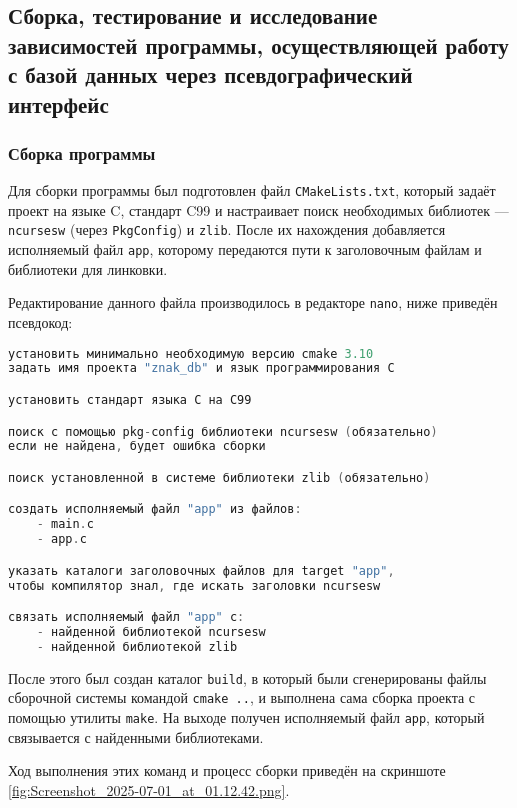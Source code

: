 \subsection{Сборка, тестирование и исследование зависимостей программы, осуществляющей работу с базой данных через псевдографический интерфейс}

\subsubsection{Сборка программы}

Для сборки программы был подготовлен файл \texttt{CMakeLists.txt}, который задаёт проект на языке C, стандарт C99 и настраивает поиск необходимых библиотек --- \texttt{ncursesw} (через \texttt{PkgConfig}) и \texttt{zlib}. После их нахождения добавляется исполняемый файл \texttt{app}, которому передаются пути к заголовочным файлам и библиотеки для линковки.

Редактирование данного файла производилось в редакторе \texttt{nano}, ниже приведён псевдокод:

\begin{lstlisting}[language=C, caption=Файл CMakeLists.txt]
установить минимально необходимую версию cmake 3.10
задать имя проекта "znak_db" и язык программирования C

установить стандарт языка C на C99

поиск с помощью pkg-config библиотеки ncursesw (обязательно)
если не найдена, будет ошибка сборки

поиск установленной в системе библиотеки zlib (обязательно)

создать исполняемый файл "app" из файлов:
    - main.c
    - app.c

указать каталоги заголовочных файлов для target "app",
чтобы компилятор знал, где искать заголовки ncursesw

связать исполняемый файл "app" с:
    - найденной библиотекой ncursesw
    - найденной библиотекой zlib
\end{lstlisting}

После этого был создан каталог \texttt{build}, в который были сгенерированы файлы сборочной системы командой \texttt{cmake ..}, и выполнена сама сборка проекта с помощью утилиты \texttt{make}. На выходе получен исполняемый файл \texttt{app}, который связывается с найденными библиотеками.

Ход выполнения этих команд и процесс сборки приведён на скриншоте \ref{fig:Screenshot_2025-07-01_at_01.12.42.png}.

